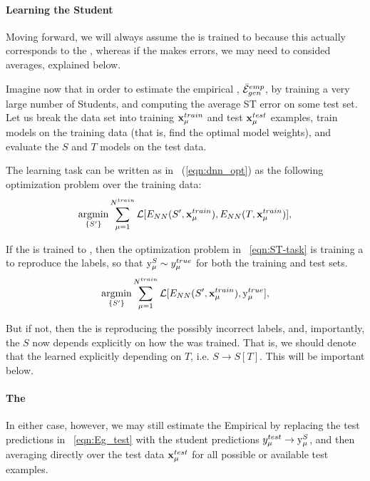 \paragraph{Learning the Student}
Moving forward, we will always assume the \Teacher is trained to \Interpolation because this
actually corresponds to the \AnnealedApproximation, whereas if the \Teacher makes
errors, we may need to consided  \Quenched averages, explained below.

Imagine now that in order to estimate the empirical \AverageGeneralizationError, $\bar{\mathcal{E}}^{emp}_{gen}$,
by training a very large number of Students, and computing the average ST error on some test set.
Let us break the data set into training $\mathbf{x}_{\mu}^{train}$ and test $\mathbf{x}_{\mu}^{test}$ examples, 
train models on the training data (that is, find the optimal model weights), 
and evaluate the $S$ and $T$ models on the test data.

The \Student learning task can be written as in \EQN~(\ref{eqn:dnn_opt})
as the following optimization problem over the training data:
\begin{align}
\underset{\{S'\}}{\text{argmin}}\sum_{\mu=1}^{N^{train}}\mathcal{L}[E_{NN}(S',\mathbf{x}_{\mu}^{train}),E_{NN}(T,\mathbf{x}_{\mu}^{train})]   ,
\label{eqn:ST-learning-task}
\end{align}

If the \Teacher is trained to \Interpolation, then the optimization problem in \EQN~\ref{eqn:ST-task} is
training a \Student to reproduce the \GroundTruth labels, so that $\mathrm{y}_{\mu}^{S}\sim y_{\mu}^{true}$
for both the training and test sets.
\begin{align}
\underset{\{S'\}}{\text{argmin}}\sum_{\mu=1}^{N^{train}}\mathcal{L}[E_{NN}(S',\mathbf{x}_{\mu}^{train}),\mathrm{y}_{\mu}^{true}]   ,
\label{eqn:ST-learning-intepolation}
\end{align}

But if not, then the \Student is reproducing the possibly
incorrect \Teacher labels, and, importantly, the \Student $S$ now depends explicitly
on how the \Teacher was trained.  That is, we should denote that the learned
\Student explicitly depending on $T$, i.e. $S\rightarrow S[T]$.
This will be important below.

\paragraph{The \AverageGeneralizationError}
In either case, however, we may still estimate the Empirical \AverageGeneralizationError
by replacing the test predictions in \EQN~\ref{eqn:Eg_test} with the student predictions
$y_{\mu}^{test}\rightarrow \mathrm{y}_{\mu}^{S}$, and then averaging directly over the test data $\mathbf{x}_{\mu}^{test}$
for all possible or available test examples.

